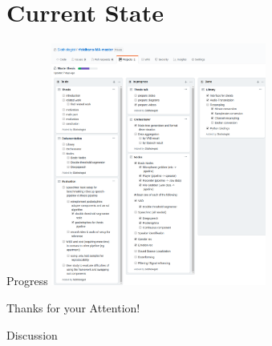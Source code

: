 \documentclass{beamer}
\begin{document}
	
	
	
	
	
	
	\section{Current State}
	
	\begin{frame}{Progress}
		\centering
		\includegraphics[height=8cm]{Bilder/progress}
	\end{frame}
	
	
	
	
	
	
	
	\begin{frame}{}
		\begin{alertblock}{Thanks for your Attention!}
		\end{alertblock}
	\end{frame}
	
	\begin{frame}{}
		\begin{alertblock}{Discussion}
		\end{alertblock}
	\end{frame}
	
\end{document}
